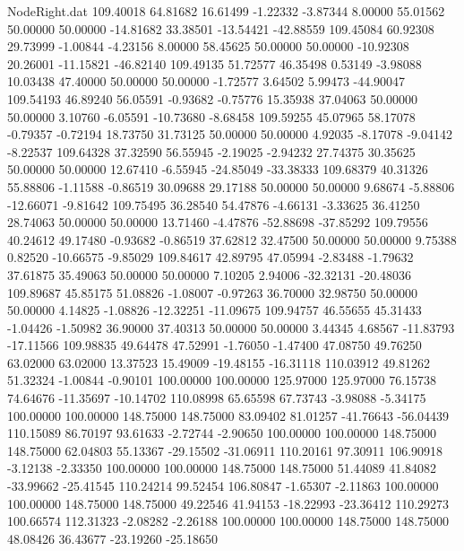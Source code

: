 \begin{filecontents}{NodeRight.dat}
 109.40018   64.81682   16.61499    -1.22332   -3.87344    8.00000   55.01562   50.00000   50.00000  -14.81682   33.38501  -13.54421  -42.88559
 109.45084   60.92308   29.73999    -1.00844   -4.23156    8.00000   58.45625   50.00000   50.00000  -10.92308   20.26001  -11.15821  -46.82140
 109.49135   51.72577   46.35498     0.53149   -3.98088   10.03438   47.40000   50.00000   50.00000   -1.72577    3.64502    5.99473  -44.90047
 109.54193   46.89240   56.05591    -0.93682   -0.75776   15.35938   37.04063   50.00000   50.00000    3.10760   -6.05591  -10.73680   -8.68458
 109.59255   45.07965   58.17078    -0.79357   -0.72194   18.73750   31.73125   50.00000   50.00000    4.92035   -8.17078   -9.04142   -8.22537
 109.64328   37.32590   56.55945    -2.19025   -2.94232   27.74375   30.35625   50.00000   50.00000   12.67410   -6.55945  -24.85049  -33.38333
 109.68379   40.31326   55.88806    -1.11588   -0.86519   30.09688   29.17188   50.00000   50.00000    9.68674   -5.88806  -12.66071   -9.81642
 109.75495   36.28540   54.47876    -4.66131   -3.33625   36.41250   28.74063   50.00000   50.00000   13.71460   -4.47876  -52.88698  -37.85292
 109.79556   40.24612   49.17480    -0.93682   -0.86519   37.62812   32.47500   50.00000   50.00000    9.75388    0.82520  -10.66575   -9.85029
 109.84617   42.89795   47.05994    -2.83488   -1.79632   37.61875   35.49063   50.00000   50.00000    7.10205    2.94006  -32.32131  -20.48036
 109.89687   45.85175   51.08826    -1.08007   -0.97263   36.70000   32.98750   50.00000   50.00000    4.14825   -1.08826  -12.32251  -11.09675
 109.94757   46.55655   45.31433    -1.04426   -1.50982   36.90000   37.40313   50.00000   50.00000    3.44345    4.68567  -11.83793  -17.11566
 109.98835   49.64478   47.52991    -1.76050   -1.47400   47.08750   49.76250   63.02000   63.02000   13.37523   15.49009  -19.48155  -16.31118
 110.03912   49.81262   51.32324    -1.00844   -0.90101  100.00000  100.00000  125.97000  125.97000   76.15738   74.64676  -11.35697  -10.14702
 110.08998   65.65598   67.73743    -3.98088   -5.34175  100.00000  100.00000  148.75000  148.75000   83.09402   81.01257  -41.76643  -56.04439
 110.15089   86.70197   93.61633    -2.72744   -2.90650  100.00000  100.00000  148.75000  148.75000   62.04803   55.13367  -29.15502  -31.06911
 110.20161   97.30911  106.90918    -3.12138   -2.33350  100.00000  100.00000  148.75000  148.75000   51.44089   41.84082  -33.99662  -25.41545
 110.24214   99.52454  106.80847    -1.65307   -2.11863  100.00000  100.00000  148.75000  148.75000   49.22546   41.94153  -18.22993  -23.36412
 110.29273  100.66574  112.31323    -2.08282   -2.26188  100.00000  100.00000  148.75000  148.75000   48.08426   36.43677  -23.19260  -25.18650

\end{filecontents}
